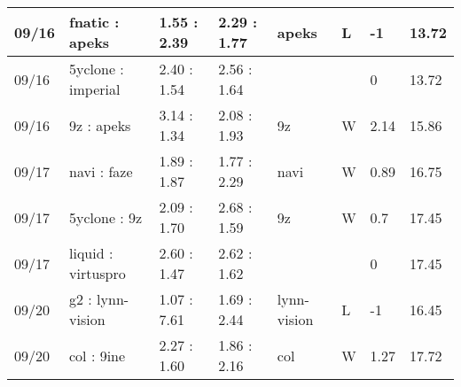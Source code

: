 \begin{small}
\begin{longtable}{|l|l|l|l|l|l|l|l|}
	09/16                               & fnatic : apeks                      & 1.55 : 2.39                             & 2.29 : 1.77                             & apeks                             & L                                 & -1                                   & 13.72                             \\ \hline
	09/16                               & 5yclone : imperial                  & 2.40 : 1.54                             & 2.56 : 1.64                             &                                   &                                   & 0                                    & 13.72                             \\ \hline
	09/16                               & 9z : apeks                          & 3.14 : 1.34                             & 2.08 : 1.93                             & 9z                                & W                                 & 2.14                                 & 15.86                             \\ \hline
	09/17                               & navi : faze                         & 1.89 : 1.87                             & 1.77 : 2.29                             & navi                              & W                                 & 0.89                                 & 16.75                             \\ \hline
	09/17                               & 5yclone : 9z                        & 2.09 : 1.70                             & 2.68 : 1.59                             & 9z                                & W                                 & 0.7                                  & 17.45                             \\ \hline
	09/17                               & liquid : virtuspro                  & 2.60 : 1.47                             & 2.62 : 1.62                             &                                   &                                   & 0                                    & 17.45                             \\ \hline
	09/20                               & g2 : lynn-vision                    & 1.07 : 7.61                             & 1.69 : 2.44                             & lynn-vision                       & L                                 & -1                                   & 16.45                             \\ \hline
	09/20                               & col : 9ine                          & 2.27 : 1.60                             & 1.86 : 2.16                             & col                               & W                                 & 1.27                                 & 17.72                             \\ \hline

\end{longtable}
\end{small}
